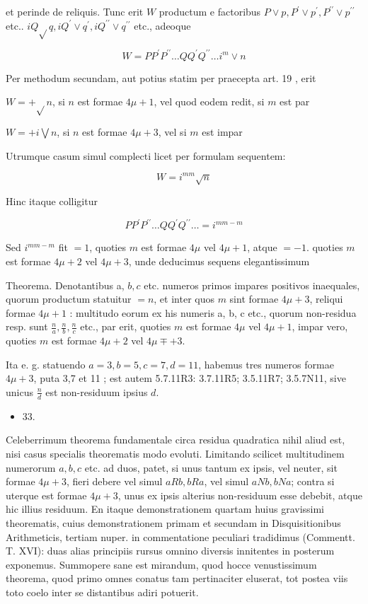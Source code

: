 \documentclass[10pt]{article}
\begin{document}
et perinde de reliquis. Tunc erit \(W\) productum e factoribus \(P \vee p, P^{\prime} \vee p^{\prime}, P^{\prime \prime} \vee p^{\prime \prime}\) etc.. \(i Q \sqrt{ } q, i Q^{\prime} \vee q^{\prime}, i Q^{\prime \prime} \vee q^{\prime \prime}\) etc., adeoque

\[
W=P P^{\prime} P^{\prime \prime} \ldots Q Q^{\prime} Q^{\prime \prime} \ldots i^{m} \vee n
\]

Per methodum secundam, aut potius statim per praecepta art. 19 , erit

\(W=+\sqrt{ } n\), si \(n\) est formae \(4 \mu+1\), vel quod eodem redit, si \(m\) est par

\(W=+i \bigvee n\), si \(n\) est formae \(4 \mu+3\), vel si \(m\) est impar

Utrumque casum simul complecti licet per formulam sequentem:

\[
W=i^{m m} \sqrt{n}
\]

Hinc itaque colligitur

\[
P P^{\prime} P^{\prime \prime} \ldots Q Q^{\prime} Q^{\prime \prime} \ldots=i^{m m-m}
\]

Sed \(i^{m m-m}\) fit \(=1\), quoties \(m\) est formae \(4 \mu\) vel \(4 \mu+1\), atque \(=-1\). quoties \(m\) est formae \(4 \mu+2\) vel \(4 \mu+3\), unde deducimus sequens elegantissimum

Theorema. Denotantibus a, \(b, c\) etc. numeros primos impares positivos inaequales, quorum productum statuitur \(=n\), et inter quos \(m\) sint formae \(4 \mu+3\), reliqui formae \(4 \mu+1\) : multitudo eorum ex his numeris a, b, c etc., quorum non-residua resp. sunt \(\frac{n}{a}, \frac{n}{b}, \frac{n}{c}\) etc., par erit, quoties \(m\) est formae \(4 \mu\) vel \(4 \mu+1\), impar vero, quoties \(m\) est formae \(4 \mu+2\) vel \(4 \mu \mp+3\).

Ita e. g. statuendo \(a=3, b=5, c=7, d=11\), habemus tres numeros formae \(4 \mu+3\), puta 3,7 et 11 ; est autem 5.7.11R3: 3.7.11R5; 3.5.11R7; 3.5.7N11, sive unicus \(\frac{n}{d}\) est non-residuum ipsius \(d\).

\begin{itemize}
  \item 
33.


\end{itemize}

Celeberrimum theorema fundamentale circa residua quadratica nihil aliud est, nisi casus specialis theorematis modo evoluti. Limitando scilicet multitudinem
numerorum \(a, b, c\) etc. ad duos, patet, si unus tantum ex ipsis, vel neuter, sit formae \(4 \mu+3\), fieri debere vel simul \(a R b, b R a\), vel simul \(a N b, b N a\); contra si uterque est formae \(4 \mu+3\), unus ex ipsis alterius non-residuum esse debebit, atque hic illius residuum. En itaque demonstrationem quartam huius gravissimi theorematis, cuius demonstrationem primam et secundam in Disquisitionibus Arithmeticis, tertiam nuper. in commentatione peculiari tradidimus (Commentt. T. XVI): duas alias principiis rursus omnino diversis innitentes in posterum exponemus. Summopere sane est mirandum, quod hocce venustissimum theorema, quod primo omnes conatus tam pertinaciter eluserat, tot postea viis toto coelo inter se distantibus adiri potuerit.
\end{document}
